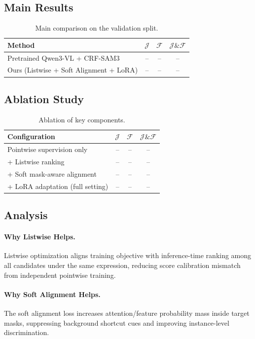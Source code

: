 \subsection{Main Results}
\begin{table}[t]
\centering
\caption{Main comparison on the validation split.}
\begin{tabular}{lccc}
\hline
Method & $\mathcal{J}$ & $\mathcal{F}$ & $\mathcal{J}\&\mathcal{F}$ \\
\hline
Pretrained Qwen3-VL + CRF-SAM3 & -- & -- & -- \\
Ours (Listwise + Soft Alignment + LoRA) & -- & -- & -- \\
\hline
\end{tabular}
\label{tab:main_results}
\end{table}

\subsection{Ablation Study}
\begin{table}[t]
\centering
\caption{Ablation of key components.}
\begin{tabular}{lccc}
\hline
Configuration & $\mathcal{J}$ & $\mathcal{F}$ & $\mathcal{J}\&\mathcal{F}$ \\
\hline
Pointwise supervision only & -- & -- & -- \\
+ Listwise ranking & -- & -- & -- \\
+ Soft mask-aware alignment & -- & -- & -- \\
+ LoRA adaptation (full setting) & -- & -- & -- \\
\hline
\end{tabular}
\label{tab:ablation}
\end{table}

\subsection{Analysis}
\paragraph{Why Listwise Helps.}
Listwise optimization aligns training objective with inference-time ranking among all candidates under the same expression, reducing score calibration mismatch from independent pointwise training.

\paragraph{Why Soft Alignment Helps.}
The soft alignment loss increases attention/feature probability mass inside target masks, suppressing background shortcut cues and improving instance-level discrimination.

